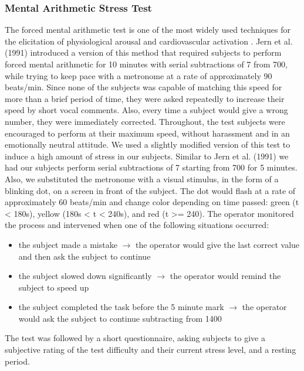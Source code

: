 \subsubsection{Mental Arithmetic Stress Test}\label{ast}
The forced mental arithmetic test is one of the most widely used techniques for the elicitation of physiological arousal and cardiovascular activation \cite{Jern1991}. Jern et al. (1991) introduced a version of this method that required subjects to perform forced mental arithmetic for 10 minutes with serial subtractions of 7 from 700, while trying to keep pace with a metronome at a rate of approximately 90 beats/min. Since none of the subjects was capable of matching this speed for more than a brief period of time, they were asked repeatedly to increase their speed by short vocal comments. Also, every time a subject would give a wrong number, they were immediately corrected. Throughout, the test subjects were encouraged to perform at their maximum speed, without harassment and in an emotionally neutral attitude.
We used a slightly modified version of this test to induce a high amount of stress in our subjects. Similar to Jern et al. (1991) we had our subjects perform serial subtractions of 7 starting from 700 for 5 minutes. Also, we substituted the metronome with a visual stimulus, in the form of a blinking dot, on a screen in front of the subject. The dot would flash at a rate of approximately 60 beats/min and change color depending on time passed: green (t < 180s), yellow (180s < t < 240s), and red (t >= 240).
The operator monitored the process and intervened when one of the following situations occurred:
\begin{itemize}
\item the subject made a mistake $\rightarrow$ the operator would give the last correct value and then ask the subject to continue
\item the subject slowed down significantly $\rightarrow$ the operator would remind the subject to speed up
\item the subject completed the task before the 5 minute mark $\rightarrow$ the operator would ask the subject to continue subtracting from 1400
\end{itemize} 
The test was followed by a short questionnaire, asking subjects to give a subjective rating of the test difficulty and their current stress level, and a resting period.

